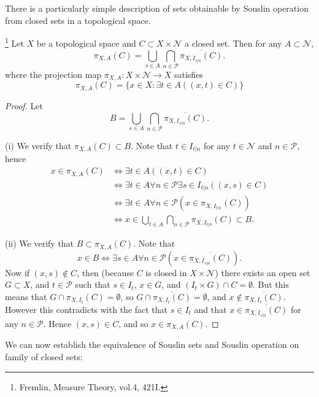 There is a particularly simple description of sets obtainable by Souslin
operation from closed sets in a topological space.
\begin{lemma} \label{L:souslin_close}
\footnote{Fremlin, Measure Theory, vol.4, 421I.}
Let $X$ be a topological space and $C\subset X\times\mathcal{N}$ a closed set.
Then for any $A\subset\mathcal{N}$,
\[
  \pi_{X,A}(C) = \bigcup_{s\in A} \bigcap_{n\in\mathcal{P}}
             \overline{ \pi_{X,I_{s|n}}(C) }.
\]
where the projection map $\pi_{X,A}:X\times \mathcal{N}\to X$ satisfies
\[
  \pi_{X,A}(C) = \{ x\in X: \exists t\in A ((x,t)\in C)  \}
\]
\end{lemma}
\begin{proof}
Let 
\[
  B = \bigcup_{s\in A} \bigcap_{n\in\mathcal{P}} \overline{ \pi_{X,I_{s|n}}(C) }.
\]

(i) We verify that $\pi_{X,A}(C)\subset B$. Note that $t\in I_{t|n}$ for any
$t\in\mathcal{N}$ and $n\in\mathcal{P}$, hence
\begin{align*}
  x\in\pi_{X,A}(C)
    & \iff \exists t\in A ((x,t)\in C)  \\
    & \iff \exists t\in A \forall n\in\mathcal{P} \exists s\in I_{t|n} ((x,s)\in C)  \\
    & \iff \exists t\in A \forall n\in\mathcal{P} (x\in \pi_{X,I_{t|n}}(C))  \\
    & \iff x\in \bigcup_{t\in A} \bigcap_{n\in\mathcal{P}} \pi_{X,I_{t|n}}(C)
	  \subset B.
\end{align*}

(ii) We verify that $B\subset\pi_{X,A}(C)$. Note that
\[
  x\in B \iff \exists s\in A \forall n\in\mathcal{P} ( x\in \overline{\pi_{X,I_{s|n}}(C)} ).
\]
Now if $(x,s)\notin C$, then (because $C$ is closed in $X\times \mathcal{N}$)
there exists an open set $G\subset X$, and $t\in \mathcal{P}$ such that 
$s\in I_t$, $x\in G$, and $(I_t\times G)\cap C=\emptyset$.
But this means that $G\cap \pi_{X,I_t}(C)=\emptyset$, 
so $G\cap \overline{\pi_{X,I_t}(C)} =\emptyset$, and $x\notin \overline{\pi_{X,I_t}(C)}$.
However this contradicts with the fact that $s\in I_t$ and that 
$x\in \overline{\pi_{X,I_{s|n}}(C)}$ for any $n\in\mathcal{P}$.
Hence $(x,s)\in C$, and so $x\in \pi_{X,A}(C)$.
\end{proof}

We can now establish the equivalence of Souslin sets and Souslin operation on
family of closed sets:

